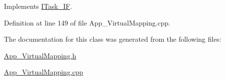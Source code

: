Implements \mbox{\hyperlink{class_i_task___i_f_af5f8fba86704c7e36d0e4681d58300c6}{I\+Task\+\_\+\+IF}}.



Definition at line 149 of file App\+\_\+\+Virtual\+Mapping.\+cpp.



The documentation for this class was generated from the following files\+:\begin{DoxyCompactItemize}
\item 
\mbox{\hyperlink{_app___virtual_mapping_8h}{App\+\_\+\+Virtual\+Mapping.\+h}}\item 
\mbox{\hyperlink{_app___virtual_mapping_8cpp}{App\+\_\+\+Virtual\+Mapping.\+cpp}}\end{DoxyCompactItemize}
